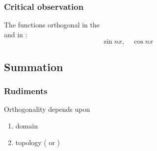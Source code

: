 \documentclass[handout]{beamer}
\begin{document}
\begin{frame}      %
\frametitle{Critical observation}
%
%
  {\huge{The  functions orthogonal in the \\
   and in :
  $$\sin nx, \quad \cos nx$$
  } }
  \onedot
\end{frame}


\subsection{Summation}
\begin{frame}      %
\frametitle{Rudiments}
{\huge
{
  Orthogonality depends upon
  \begin{enumerate}
    \item domain
    \item topology \pause ( or )
  \end{enumerate}
}}
\end{frame}
\end{document}
